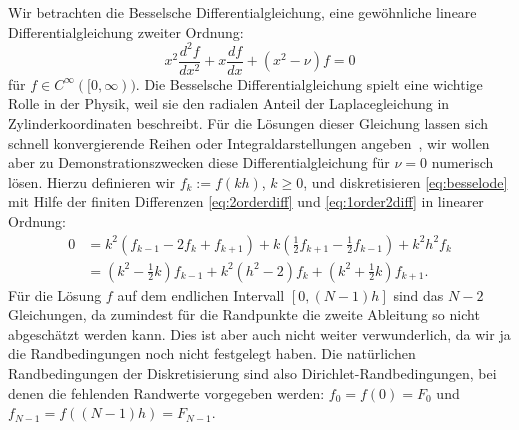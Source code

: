 Wir betrachten die Besselsche Differentialgleichung, eine gewöhnliche
lineare Differentialgleichung zweiter Ordnung:
\begin{equation}
  \label{eq:besselode}
  x^2\frac{d^2f}{dx^2} + x\frac{df}{dx} + (x^2-\nu)f = 0
\end{equation}
für $f\in C^{\infty}([0,\infty))$. Die Besselsche
Differentialgleichung spielt eine wichtige Rolle in der Physik, weil
sie den radialen Anteil der Laplacegleichung in Zylinderkoordinaten
beschreibt.  Für die Lösungen dieser Gleichung lassen sich schnell
konvergierende Reihen oder Integraldarstellungen
angeben~\cite{abramowitz70a,jackson99}, wir wollen aber zu
Demonstrationszwecken diese Differentialgleichung für $\nu=0$
numerisch lösen. Hierzu definieren wir $f_k := f(kh)$, $k\ge 0$, und
diskretisieren \eqref{eq:besselode} mit Hilfe der finiten Differenzen
\eqref{eq:2orderdiff} und \eqref{eq:1order2diff} in linearer Ordnung:
\begin{align}
  \label{eq:besseldiscrete}
  0 &= k^2\left(f_{k-1} - 2f_k + f_{k+1} \right)
  + k\left(\frac{1}{2} f_{k+1} - \frac{1}{2} f_{k-1}\right)
  + k^2h^2f_k\nonumber\\
  &= \left(k^2 - \frac{1}{2}k\right)f_{k-1}
  + k^2(h^2 - 2)f_k
  + \left(k^2 + \frac{1}{2}k\right)f_{k+1}.
\end{align}
Für die Lösung $f$ auf dem endlichen Intervall $[0, (N-1)h]$ sind das
$N-2$ Gleichungen, da zumindest für die Randpunkte die zweite
Ableitung so nicht abgeschätzt werden kann. Dies ist aber auch nicht
weiter verwunderlich, da wir ja die Randbedingungen noch nicht
festgelegt haben. Die natürlichen Randbedingungen der Diskretisierung
sind also Dirichlet-Randbedingungen, bei denen die fehlenden Randwerte
vorgegeben werden: $f_0 = f(0)=F_0$ und $f_{N-1} = f((N-1)h) = F_{N-1}$.

